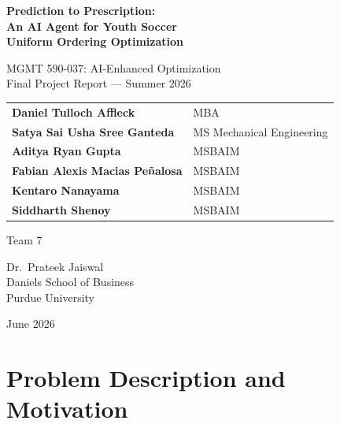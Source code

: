 \documentclass[11pt, letterpaper]{article}
\begin{document}
\begin{titlepage}
\centering
\vspace*{1.5cm}

{\Huge\bfseries Prediction to Prescription:\\[6pt]
An AI Agent for Youth Soccer\\[4pt]
Uniform Ordering Optimization}

\vspace{1.5cm}

{\Large MGMT 590-037: AI-Enhanced Optimization}\\[4pt]
{\large Final Project Report --- Summer 2026}

\vspace{2cm}

{\large
\begin{tabular}{ll}
\textbf{Daniel Tulloch Affleck} & MBA \\
\textbf{Satya Sai Usha Sree Ganteda} & MS Mechanical Engineering \\
\textbf{Aditya Ryan Gupta} & MSBAIM \\
\textbf{Fabian Alexis Macias Pe\~nalosa} & MSBAIM \\
\textbf{Kentaro Nanayama} & MSBAIM \\
\textbf{Siddharth Shenoy} & MSBAIM \\
\end{tabular}
}

\vspace{0.5cm}
{\normalsize Team 7}

\vspace{2cm}

{\large
Dr.\ Prateek Jaiswal\\
Daniels School of Business\\
Purdue University
}

\vfill
{\small June 2026}
\end{titlepage}

\newpage
\tableofcontents
\newpage

\section{Problem Description and Motivation}
\end{document}
